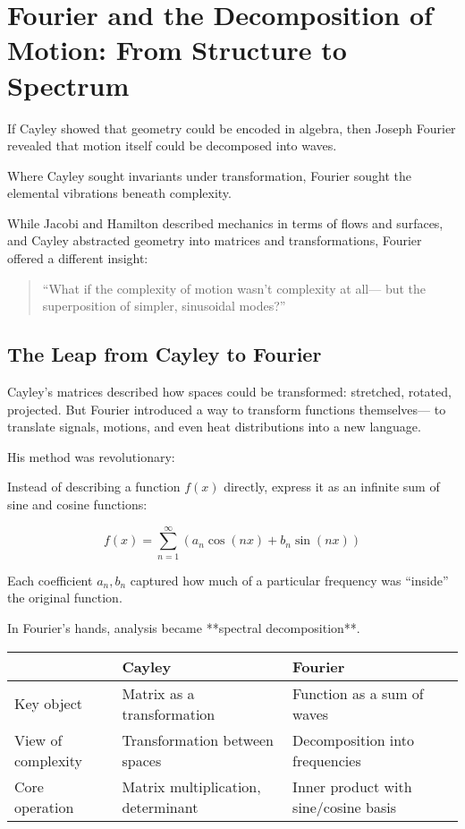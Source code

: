 \section{Fourier and the Decomposition of Motion: From Structure to Spectrum}

If Cayley showed that geometry could be encoded in algebra,  
then Joseph Fourier revealed that motion itself could be decomposed into waves.

Where Cayley sought invariants under transformation,  
Fourier sought the elemental vibrations beneath complexity.

While Jacobi and Hamilton described mechanics in terms of flows and surfaces,  
and Cayley abstracted geometry into matrices and transformations,  
Fourier offered a different insight:

\begin{quote}
“What if the complexity of motion wasn’t complexity at all—  
but the superposition of simpler, sinusoidal modes?”
\end{quote}

\bigskip

\subsection*{The Leap from Cayley to Fourier}

Cayley’s matrices described how spaces could be transformed: stretched, rotated, projected.  
But Fourier introduced a way to transform functions themselves—  
to translate signals, motions, and even heat distributions into a new language.

His method was revolutionary:

Instead of describing a function \( f(x) \) directly,  
express it as an infinite sum of sine and cosine functions:

\[
f(x) = \sum_{n=1}^{\infty} \left( a_n \cos(nx) + b_n \sin(nx) \right)
\]

Each coefficient \( a_n, b_n \) captured how much of a particular frequency was “inside” the original function.

In Fourier’s hands, analysis became **spectral decomposition**.

\bigskip

\begin{tcolorbox}[colback=gray!5!white, colframe=black, title=\textbf{Sidebar: The Shift from Cayley to Fourier}, fonttitle=\bfseries, arc=1.5mm, boxrule=0.4pt]

\begin{tabular}{>{\raggedright}p{4cm} >{\raggedright}p{5.5cm} >{\raggedright\arraybackslash}p{5.5cm}}
 & \textbf{Cayley} & \textbf{Fourier} \\
\midrule
Key object & Matrix as a transformation & Function as a sum of waves \\
View of complexity & Transformation between spaces & Decomposition into frequencies \\
Core operation & Matrix multiplication, determinant & Inner product with sine/cosine basis
\end{tabular}

\end{tcolorbox}


